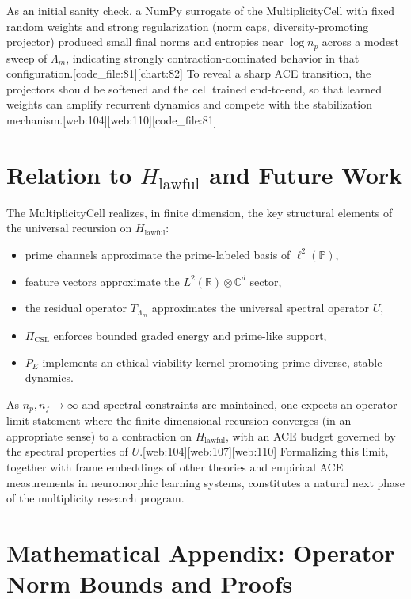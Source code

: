 \documentclass[11pt]{article}
\theoremstyle{definition}
\theoremstyle{plain}
\begin{document}
As an initial sanity check, a NumPy surrogate of the MultiplicityCell with fixed random weights and strong regularization (norm caps, diversity-promoting projector) produced small final norms and entropies near $\log n_p$ across a modest sweep of $\Lambda_m$, indicating strongly contraction-dominated behavior in that configuration.[code_file:81][chart:82]
To reveal a sharp ACE transition, the projectors should be softened and the cell trained end-to-end, so that learned weights can amplify recurrent dynamics and compete with the stabilization mechanism.[web:104][web:110][code_file:81]

\section{Relation to $H_{\mathrm{lawful}}$ and Future Work}

The MultiplicityCell realizes, in finite dimension, the key structural elements of the universal recursion on $H_{\mathrm{lawful}}$:
\begin{itemize}[leftmargin=*]
  \item prime channels approximate the prime-labeled basis of $\ell^2(\mathbb{P})$,
  \item feature vectors approximate the $L^2(\mathbb{R}) \otimes \mathbb{C}^d$ sector,
  \item the residual operator $T_{\Lambda_m}$ approximates the universal spectral operator $U$,
  \item $\Pi_{\mathrm{CSL}}$ enforces bounded graded energy and prime-like support,
  \item $P_E$ implements an ethical viability kernel promoting prime-diverse, stable dynamics.
\end{itemize}

As $n_p,n_f \to \infty$ and spectral constraints are maintained, one expects an operator-limit statement where the finite-dimensional recursion converges (in an appropriate sense) to a contraction on $H_{\mathrm{lawful}}$, with an ACE budget governed by the spectral properties of $U$.[web:104][web:107][web:110]
Formalizing this limit, together with frame embeddings of other theories and empirical ACE measurements in neuromorphic learning systems, constitutes a natural next phase of the multiplicity research program.

\appendix
\section*{Mathematical Appendix: Operator Norm Bounds and Proofs}
\end{document}
